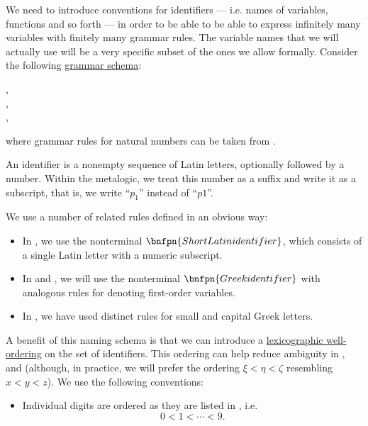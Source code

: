 \begin{remark}\label{rem:grammar_rules_for_variables}
  We need to introduce conventions for identifiers --- i.e. names of variables, functions and so forth --- in order to be able to be able to express infinitely many variables with finitely many grammar rules. The variable names that we will actually use will be a very specific subset of the ones we allow formally. Consider the following \hyperref[def:formal_grammar/schema]{grammar schema}:
  \begin{bnf*}
               { \bnfor {} \bnfor \cdots \bnfor {} \bnfor {} \bnfor {} \bnfor \cdots \bnfor {}}, \\
               { \bnfor {} \bnfsp {}}, \\
           { \bnfor {} \bnfsp {}},
  \end{bnf*}
  where grammar rules for natural numbers can be taken from .

  An identifier is a nonempty sequence of Latin letters, optionally followed by a number. Within the metalogic, we treat this number as a suffix and write it as a subscript, that is, we write \enquote{\( p_1 \)} instead of \enquote{\( p1 \)}.

  We use a number of related rules defined in an obvious way:
  \begin{itemize}
    \item In , we use the nonterminal \( \bnfpn{Short Latin identifier} \), which consists of a single Latin letter with a numeric subscript.
    \item In  and , we will use the nonterminal \( \bnfpn{Greek identifier} \) with analogous rules for denoting first-order variables.
    \item In , we have used distinct rules for small and capital Greek letters.
  \end{itemize}

  A benefit of this naming schema is that we can introduce a \hyperref[thm:def:well_ordered_set/lexicographic]{lexicographic well-ordering} on the set of identifiers. This ordering can help reduce ambiguity in ,  and  (although, in practice, we will prefer the ordering \( \xi < \eta < \zeta \) resembling \( x < y < z \)). We use the following conventions:
  \begin{itemize}
    \item Individual digits are ordered as they are listed in , i.e.
    \begin{equation*}
      0 < 1 < \cdots < 9.
    \end{equation*}


\end{itemize}
\end{remark}
